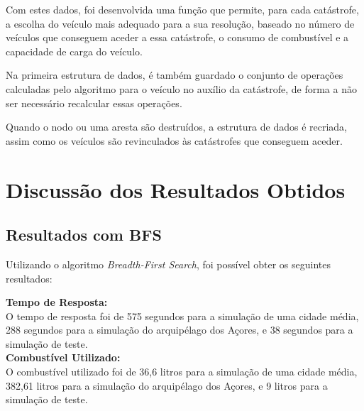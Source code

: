 \documentclass[a4paper,12pt]{scrreprt}
\begin{document}
Com estes dados, foi desenvolvida uma função que permite, para cada catástrofe, a escolha do veículo mais adequado para a sua resolução,
baseado no número de veículos que conseguem aceder a essa catástrofe, o consumo de combustível e a capacidade de carga do veículo.

Na primeira estrutura de dados, é também guardado o conjunto de operações calculadas pelo algoritmo para o veículo no auxílio da catástrofe, de forma 
a não ser necessário recalcular essas operações.

Quando o nodo ou uma aresta são destruídos, a estrutura de dados é recriada, assim como os veículos são revinculados às catástrofes que conseguem aceder. 



\chapter{Discussão dos Resultados Obtidos}

\section{Resultados com BFS}

Utilizando o algoritmo \textit{Breadth-First Search}, foi possível obter os seguintes resultados:


\textbf{Tempo de Resposta:} \\
O tempo de resposta foi de 575 segundos para a simulação de uma cidade média, 288 segundos para a simulação
do arquipélago dos Açores, e 38 segundos para a simulação de teste. \\

\textbf{Combustível Utilizado:} \\
O combustível utilizado foi de 36,6 litros para a simulação de uma cidade média, 382,61 litros para a simulação
do arquipélago dos Açores, e 9 litros para a simulação de teste. \\

\clearpage
\end{document}
